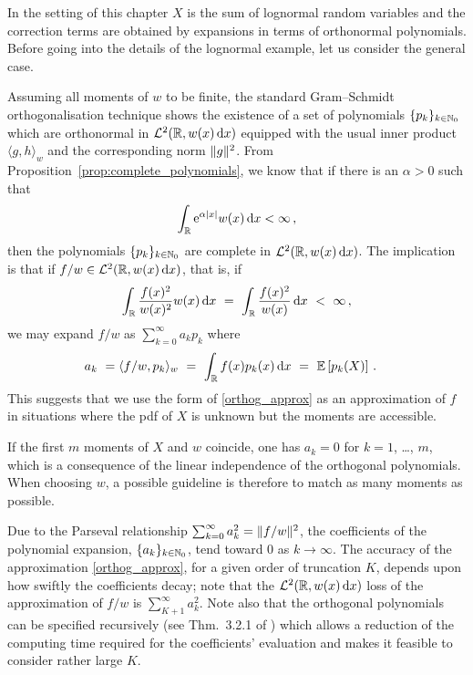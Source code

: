 In the setting of this chapter $X$ is the sum of lognormal random variables and the correction terms are obtained by expansions in terms of orthonormal polynomials.
Before going into the details of the lognormal example, let us consider the general case.

\newpage
Assuming all moments of $w$ to be finite,
the standard Gram--Schmidt orthogonalisation technique shows the existence
of a set of polynomials $\{p_k\}_{k\in\mathbb{N}_0}$ which are orthonormal in
$\mathcal{L}^2(\mathbb{R}, w(x) \mathop{}\!\mathrm{d} x)$ equipped with the usual inner product
$\langle g, h \rangle_w$ and the corresponding norm
$\lVert g\rVert^2$.
From Proposition~\ref{prop:complete_polynomials}, we know that if there is an $\alpha>0$ such that
\begin{equation}\label{DefinedMGFCondition}
\int_{\mathbb{R}} \mathrm{e}^{\alpha|x|} w(x) \mathop{}\!\mathrm{d} x < \infty\,,
\end{equation}
then the polynomials $\{p_k\}_{k\in\mathbb{N}_0}$ are complete in $\mathcal{L}^2(\mathbb{R}, w(x) \mathop{}\!\mathrm{d} x)$. The implication is that if $f/w \in \mathcal{L}^2(\mathbb{R}, w(x) \mathop{}\!\mathrm{d} x)$, that is, if
\begin{equation}\label{L2Condition1}
\int_{\mathbb{R}} \frac{f(x)^2}{w(x)^2} w(x) \mathop{}\!\mathrm{d} x\ =\ \int_{\mathbb{R}} \frac{f(x)^2}{w(x)} \mathop{}\!\mathrm{d} x\ <\ \infty\,,
\end{equation}
we may expand $f/w$ as $\sum_{k=0}^\infty a_k p_k$ where
\begin{align}\label{28.10a}a_k\ &=
\langle f/w, p_k \rangle_w\ =\ \int_{\RL} f(x) p_k(x) \dd x\ =\ \Exp\left[p_k(X)\right]\,.
\end{align}
This suggests that we use the form of \eqref{orthog_approx} as an approximation of $f$ in situations where the pdf of $X$ is unknown but the moments are accessible.

\begin{remark}\label{Rem:27.10a}
If the first $m$ moments of $X$ and $w$ coincide, one has $a_k=0$ for $k=1$, \ldots, $m$, which is a consequence of the linear independence of the orthogonal polynomials.
When choosing $w$, a possible guideline is therefore to match as many moments as possible.
\remQED
\end{remark}

Due to the Parseval relationship $\sum_{k=0}^\infty a_k^2=\lVert f/w\rVert^2$, the coefficients of the polynomial expansion, $\{a_k\}_{k\in\mathbb{N}_0}$, tend toward $0$ as $k \to \infty$.
The accuracy of the approximation \eqref{orthog_approx}, for a given order of truncation $K$, depends upon how swiftly the coefficients decay; note that the $\mathcal{L}^2(\mathbb{R}, w(x) \mathop{}\!\mathrm{d} x)$ loss of the approximation of $f/w$ is $\sum_{K+1}^{\infty}a_k^2$.
Note also that the orthogonal polynomials can be specified recursively
(see Thm.~3.2.1 of \cite{Szegoe1939}) which allows a reduction of the computing time required for the coefficients' evaluation
and makes it feasible to consider rather large $K$.

